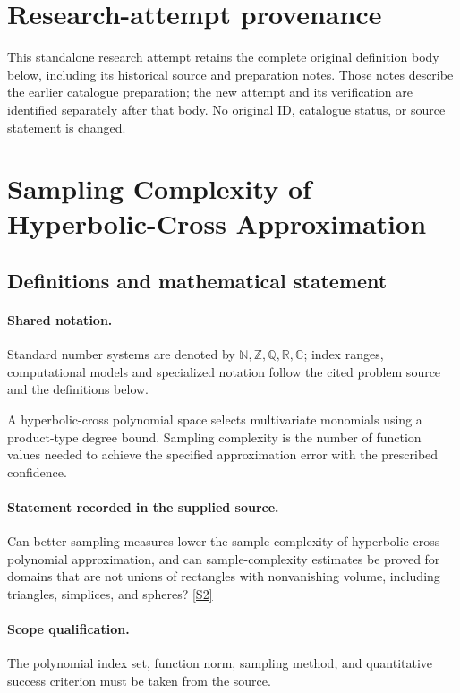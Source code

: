 \documentclass[11pt]{article}
\begin{document}
\section*{Research-attempt provenance}
This standalone research attempt retains the complete original definition body below,
including its historical source and preparation notes. Those notes describe the
earlier catalogue preparation; the new attempt and its verification are identified
separately after that body. No original ID, catalogue status, or source statement is changed.

\section{Sampling Complexity of Hyperbolic-Cross Approximation}\label{statement}

\subsection{Definitions and mathematical statement}

\paragraph{Shared notation.}Standard number systems are denoted by $\mathbb N,\mathbb Z,\mathbb Q,\mathbb R,\mathbb C$; index ranges, computational models and specialized notation follow the cited problem source and the definitions below.


A hyperbolic-cross polynomial space selects multivariate monomials using a product-type degree bound. Sampling complexity is the number of function values needed to achieve the specified approximation error with the prescribed confidence.
\paragraph{Statement recorded in the supplied source.}
Can better sampling measures lower the sample complexity of hyperbolic-cross polynomial approximation, and can sample-complexity estimates be proved for domains that are not unions of rectangles with nonvanishing volume, including triangles, simplices, and spheres? \href{https://doi.org/10.4171/owr/2017/17}{[S2]}
\paragraph{Scope qualification.}
The polynomial index set, function norm, sampling method, and quantitative success criterion must be taken from the source.
\end{document}
